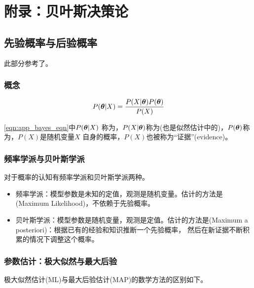 \chapter{附录：贝叶斯决策论}
\label{app:entory}

\section{先验概率与后验概率}
此部分参考了\cite{MLEAndMAP}。

\subsection{概念}
\[
    P({\bm{\theta}} \vert X) = \frac{P(X \vert {\bm{\theta}} )P({\bm{\theta}})}{P(X)}
    \label{eqn:app_bayes_eqn}
\]
 
\eqref{eqn:app_bayes_eqn}中$P({\bm{\theta}} \vert X)$ 称为，$P(X\vert{\bm{\theta}} )$称为(也是似然估计中的)，$P({\bm{\theta}})$称为，$P(X)$是随机变量$X$ 自身的概率，$P(X)$也被称为“证据”(evidence)。

\subsection{频率学派与贝叶斯学派} 

对于概率的认知有频率学派和贝叶斯学派两种。
\begin{itemize}
    \item  频率学派：模型参数是未知的定值，观测是随机变量。估计的方法是(Maximum Likelihood)，不依赖于先验概率。
    \item  贝叶斯学派：模型参数是随机变量，观测是定值。估计的方法是(Maximum a posteriori)：根据已有的经验和知识推断一个先验概率， 然后在新证据不断积累的情况下调整这个概率。
\end{itemize}


\subsection{参数估计：极大似然与最大后验}
极大似然估计(ML)与最大后验估计(MAP)的数学方法的区别如下。

